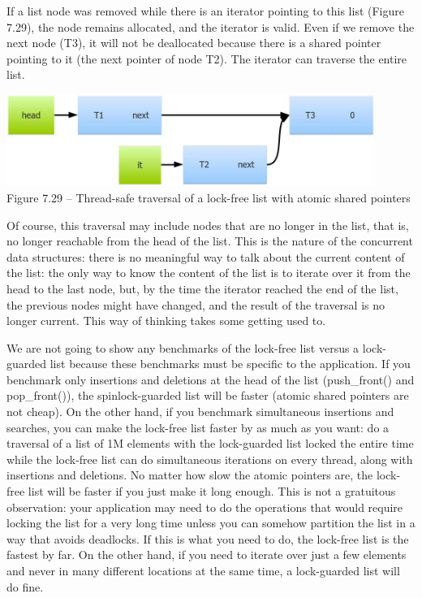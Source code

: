 If a list node was removed while there is an iterator pointing to this list (Figure 7.29), the node remains allocated, and the iterator is valid. Even if we remove the next node (T3), it will not be deallocated because there is a shared pointer pointing to it (the next pointer of node T2). The iterator can traverse the entire list.

\begin{center}
\includegraphics[width=0.9\textwidth]{content/2/chapter7/images/29.jpg}\\
Figure 7.29 – Thread-safe traversal of a lock-free list with atomic shared pointers
\end{center}

Of course, this traversal may include nodes that are no longer in the list, that is, no longer reachable from the head of the list. This is the nature of the concurrent data structures: there is no meaningful way to talk about the current content of the list: the only way to know the content of the list is to iterate over it from the head to the last node, but, by the time the iterator reached the end of the list, the previous nodes might have changed, and the result of the traversal is no longer current. This way of thinking takes some getting used to. 

We are not going to show any benchmarks of the lock-free list versus a lock-guarded list because these benchmarks must be specific to the application. If you benchmark only insertions and deletions at the head of the list (push\_front() and pop\_front()), the spinlock-guarded list will be faster (atomic shared pointers are not cheap). On the other hand, if you benchmark simultaneous insertions and searches, you can make the lock-free list faster by as much as you want: do a traversal of a list of 1M elements with the lock-guarded list locked the entire time while the lock-free list can do simultaneous iterations on every thread, along with insertions and deletions. No matter how slow the atomic pointers are, the lock-free list will be faster if you just make it long enough. This is not a gratuitous observation: your application may need to do the operations that would require locking the list for a very long time unless you can somehow partition the list in a way that avoids deadlocks. If this is what you need to do, the lock-free list is the fastest by far. On the other hand, if you need to iterate over just a few elements and never in many different locations at the same time, a lock-guarded list will do fine. 


